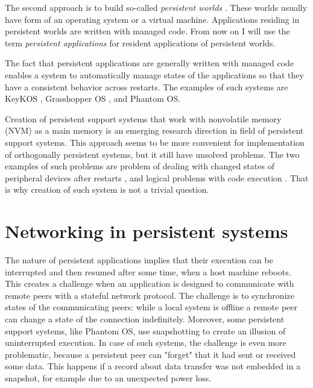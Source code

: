 The second approach is to build so-called \textit{persistent worlds} 
\cite{atkinson1995orthogonally}. These worlds usually have form of an operating
system or a virtual machine. Applications residing in persistent worlds are
written with managed code. From now on I will use the term \textit{persistent
applications} for resident applications of persistent worlds.

The fact that persistent applications are generally written with managed code
enables a system to automatically manage states of the applications so that they
have a consistent behavior across restarts. The examples of such systems are
KeyKOS \cite{bomberger1992keykos}, Grasshopper OS \cite{dearle1994grasshopper},
and Phantom OS. 

Creation of persistent support systems that work with nonvolatile memory (NVM)
as a main memory is an emerging research direction in field of persistent
support systems. This approach seems to be more convenient for implementation of
orthogonally persistent systems, but it still have unsolved problems.  The two
examples of such problems are problem of dealing with changed states of
peripheral devices after restarts \cite{berthou2018peripheral}, and logical
problems with code execution \cite{ransford2014nonvolatile}. That is why
creation of such system is not a trivial question. 

\section{Networking in persistent systems}

The nature of persistent applications implies that their execution can be
interrupted and then resumed after some time, when a host machine reboots. This
creates a challenge when an application is designed to communicate with remote
peers with a stateful network protocol. The challenge is to synchronize
states of the communicating peers: while a local system is offline a remote peer
can change a state of the connection indefinitely. Moreover, some persistent
support systems, like Phantom OS, use snapshotting to create an illusion of
uninterrupted execution. In case of such systems, the challenge is even more
problematic, because a persistent peer can "forget" that it had sent or received
some data. This happens if a record about data transfer was not embedded in a
snapshot, for example due to an unexpected power loss.


